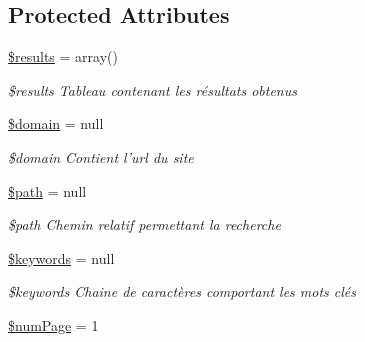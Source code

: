 \subsection*{Protected Attributes}
\begin{DoxyCompactItemize}
\item 
\hypertarget{class_generic_images_downloader_a233d12bd8b6d3453e9a7a3f0b8c31db2}{\hyperlink{class_generic_images_downloader_a233d12bd8b6d3453e9a7a3f0b8c31db2}{\$results} = array()}\label{class_generic_images_downloader_a233d12bd8b6d3453e9a7a3f0b8c31db2}

\begin{DoxyCompactList}\small\item\em \$results Tableau contenant les résultats obtenus \end{DoxyCompactList}\item 
\hypertarget{class_generic_images_downloader_aef9cf198312d2f89238a8e8e2f0f67f3}{\hyperlink{class_generic_images_downloader_aef9cf198312d2f89238a8e8e2f0f67f3}{\$domain} = null}\label{class_generic_images_downloader_aef9cf198312d2f89238a8e8e2f0f67f3}

\begin{DoxyCompactList}\small\item\em \$domain Contient l'url du site \end{DoxyCompactList}\item 
\hypertarget{class_generic_images_downloader_a0a4baf0b22973c07685c3981f0d17fc4}{\hyperlink{class_generic_images_downloader_a0a4baf0b22973c07685c3981f0d17fc4}{\$path} = null}\label{class_generic_images_downloader_a0a4baf0b22973c07685c3981f0d17fc4}

\begin{DoxyCompactList}\small\item\em \$path Chemin relatif permettant la recherche \end{DoxyCompactList}\item 
\hypertarget{class_generic_images_downloader_a9fbd95bfcdf27d802a8c7938529a61ba}{\hyperlink{class_generic_images_downloader_a9fbd95bfcdf27d802a8c7938529a61ba}{\$keywords} = null}\label{class_generic_images_downloader_a9fbd95bfcdf27d802a8c7938529a61ba}

\begin{DoxyCompactList}\small\item\em \$keywords Chaine de caractères comportant les mots clés \end{DoxyCompactList}\item 
\hypertarget{class_generic_images_downloader_ad9721caaec06f589accb445e1679fb2b}{\hyperlink{class_generic_images_downloader_ad9721caaec06f589accb445e1679fb2b}{\$num\-Page} = 1}\label{class_generic_images_downloader_ad9721caaec06f589accb445e1679fb2b}


\end{DoxyCompactItemize}
